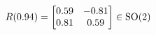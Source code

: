 \documentclass[preview]{standalone}
\begin{document}
\begin{align*}
\special{dvisvgm:raw <g id='unique000'>}R(0.94) = \begin{bmatrix} 0.59 & -0.81 \\ 0.81 & 0.59 \end{bmatrix} \in \text{SO}(2)\special{dvisvgm:raw </g>}
\end{align*}
\end{document}
